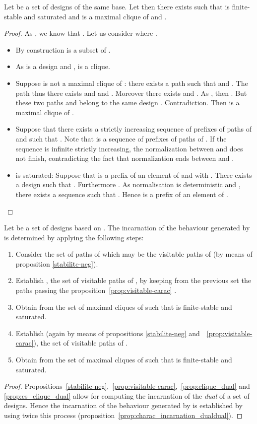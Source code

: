 \documentclass{LMCS}
\begin{document}
\begin{prop}\label{prop:cs_clique_dual}
Let  be a set of designs of the same base. 
Let  then there exists  such that  is finite-stable and saturated and  is a maximal clique of  and .
\end{prop}
\begin{proof}
As , we know that . Let us consider  where .
\begin{itemize}
\item By construction  is a subset of . 
\item As  is a design and ,  is a clique.
\item Suppose  is not a maximal clique of : there exists a path  such that  and . The path  thus there exists  and  and . Moreover there exists  and . As , then . But these two paths  and  belong to the same design . Contradiction. Then  is a maximal clique of .
\item Suppose that there exists a strictly increasing sequence  of prefixes of paths of  and  such that . 
Note that  is a sequence of prefixes of paths of . If the sequence is infinite strictly increasing, the normalization between  and  does not finish, contradicting the fact that normalization ends between  and .
\item  is saturated: Suppose that  is a prefix of an element of  and  with . There exists a design  such that . Furthermore . As normalisation is deterministic and , there exists a sequence  such that . Hence  is a prefix of an element of .\qedhere
\end{itemize}
\end{proof}

\begin{prop}\label{prop:incarnation_by_dual}
Let  be a set of designs based on . The incarnation of the behaviour generated by  is determined by applying the following steps:
\begin{enumerate}
\item Consider the set of paths of  which may be the visitable paths of  (by means of proposition \ref{stabilite-neg}).
\item Establish , the set of visitable paths of , by keeping from the previous set the paths passing the proposition~\ref{prop:visitable-carac} .
\item Obtain  from the set of maximal cliques  of  such that  is finite-stable and saturated.
\item Establish   (again by means of propositions \ref{stabilite-neg} and~~\ref{prop:visitable-carac}), the set of visitable paths of .
\item Obtain  from the set of maximal cliques  of  such that  is finite-stable and saturated.
\end{enumerate}
\end{prop}
\begin{proof}
Propositions~\ref{stabilite-neg},~\ref{prop:visitable-carac},~\ref{prop:clique_dual} and \ref{prop:cs_clique_dual} allow for computing the incarnation of the {\em dual} of a set of designs. Hence the incarnation of the behaviour generated by  is established by using twice this process (proposition~\ref{prop:charac_incarnation_dualdual}).
\end{proof}
\end{document}
